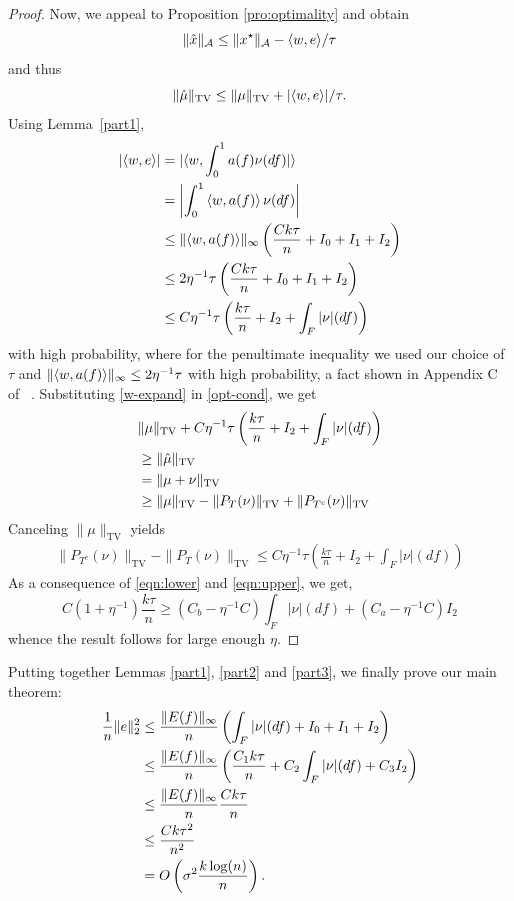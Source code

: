 \begin{proof}
Now, we appeal to Proposition \ref{pro:optimality} and obtain
\[
\lVert\hat{x}\rVert_{\mathcal{A}} \leq \lVert x^\star\rVert_{\mathcal{A}} - \langle w, e \rangle/\tau
\]
and thus
\begin{equation}
\label{opt-cond}
\lVert\hat{\mu}\rVert_{\mathrm{TV}} \leq \lVert\mu\rVert_{\mathrm{TV}} + |\langle w, e \rangle|/\tau.
\end{equation}
Using Lemma~\ref{part1},
\begin{align}
\nonumber |\langle w, e \rangle| & = |\langle w, \int_0^1 a(f) \nu(df)  |\rangle\\
& = \left|\int_0^1  \left\langle w,  a(f)  \right\rangle \nu(df)\right|\\
\nonumber & \leq \lVert\left\langle w,  a(f)  \right\rangle\rVert_\infty\left(\frac{C k \tau}{n} + I_0 + I_1 + I_2\right)\\
\label{w-expand}& \leq 2\eta^{-1} \tau \left(\frac{C k \tau}{n} + I_0 + I_1 + I_2\right)\nonumber \\
 & \leq C \eta^{-1} \tau \left(\frac{k\tau}{n} + I_2 + \int_F |\nu|(df) \right)
\end{align}
with high probability, where for the penultimate inequality we used our choice of $\tau$ and $\lVert\left\langle w,  a(f)  \right\rangle\rVert_\infty \leq 2\eta^{-1} \tau$ with high probability, a fact shown in Appendix C of ~\cite{btr12}. 
Substituting \eqref{w-expand} in \eqref{opt-cond}, we get
\begin{align*}
& \lVert\mu\rVert_{\mathrm{TV}} + C \eta^{-1} \tau \left(\frac{k\tau}{n} + I_2 + \int_F |\nu|(df) \right)\\
& \geq \lVert\hat{\mu}\rVert_{\mathrm{TV}}\\
& = \lVert\mu + \nu\rVert_{\mathrm{TV}}\\
& \geq \lVert\mu\rVert_{\mathrm{TV}} - \lVert{P_T(\nu)}\rVert_{\mathrm{TV}} + \lVert{P_{T^c}(\nu)}\rVert_{\mathrm{TV}}\end{align*}
Canceling $\|\mu\|_{\mathrm{TV}}$ yields 
\begin{align}\label{eqn:upper}
\|P_{T^c}(\nu)\|_{\mathrm{TV}} - \|P_T(\nu)\|_{\mathrm{TV}} \leq C\eta^{-1}\tau \left(\frac{k \tau}{n} + I_2 + \int_F |\nu|(df)\right)
\end{align}
As a consequence of \eqref{eqn:lower} and \eqref{eqn:upper}, we get,
\[
  C(1+\eta^{-1}) \frac{k \tau}{n} \geq  ( C_b - \eta^{-1} C)  \int_F{|\nu|(df)} + ( C_a - \eta^{-1} C)I_2
\]
whence the result follows for large enough $\eta.$
\end{proof}

Putting together Lemmas \ref{part1}, \ref{part2} and \ref{part3}, we finally prove our main theorem:
\begin{align*}
\frac{1}{n}\lVert e\rVert_2^2 
&\leq \frac{\lVert E(f)\rVert_\infty}{n} \left(\int_F{|\nu|(df)} + I_0 + I_1 + I_2\right)\\
&\leq \frac{\lVert E(f)\rVert_\infty}{n} \left(\frac{C_1 k \tau}{n} + C_2 \int_F{|\nu|(df)} + C_3 I_2\right)\\
&\leq  \frac{\lVert E(f)\rVert_\infty}{n} \frac{C k \tau}{n} \\
& \leq \frac{C k \tau^2}{n^2}\\
&= O\left(\sigma^2\frac{k \log(n)}{n}\right).
\end{align*}

